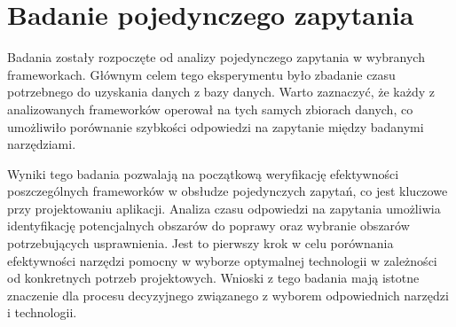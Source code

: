\section{Badanie pojedynczego zapytania}

Badania zostały rozpoczęte od analizy pojedynczego zapytania w wybranych frameworkach.
Głównym celem tego eksperymentu było zbadanie czasu potrzebnego do uzyskania danych z bazy danych.
Warto zaznaczyć, że każdy z analizowanych frameworków operował na tych samych zbiorach danych, co umożliwiło porównanie szybkości odpowiedzi na zapytanie między badanymi narzędziami.

Wyniki tego badania pozwalają na początkową weryfikację efektywności poszczególnych frameworków w obsłudze pojedynczych zapytań, co jest kluczowe przy projektowaniu aplikacji.
Analiza czasu odpowiedzi na zapytania umożliwia identyfikację potencjalnych obszarów do poprawy oraz wybranie obszarów potrzebujących usprawnienia.
Jest to pierwszy krok w celu porównania efektywności narzędzi pomocny w wyborze optymalnej technologii w zależności od konkretnych potrzeb projektowych.
Wnioski z tego badania mają istotne znaczenie dla procesu decyzyjnego związanego z wyborem odpowiednich narzędzi i technologii.



